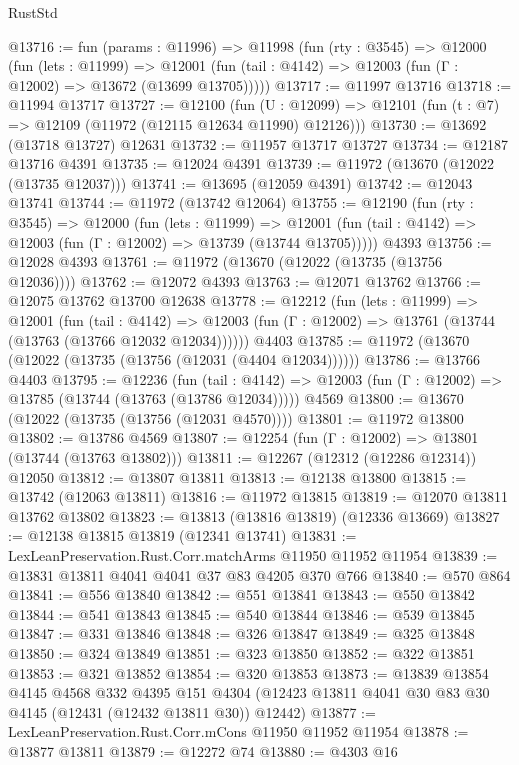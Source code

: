 \begin{lexlean}{RustStd}
\begin{coremodule}
@13716 := fun (params : @11996) =>
  @11998
    (fun (rty : @3545) =>
    @12000
      (fun (lets : @11999) =>
      @12001 (fun (tail : @4142) => @12003 (fun (Γ : @12002) => @13672 (@13699 @13705)))))
@13717 := @11997 @13716
@13718 := @11994 @13717
@13727 := @12100
    (fun (U : @12099) => @12101 (fun (t : @7) => @12109 (@11972 (@12115 @12634 @11990) @12126)))
@13730 := @13692 (@13718 @13727) @12631
@13732 := @11957 @13717 @13727
@13734 := @12187 @13716 @4391
@13735 := @12024 @4391
@13739 := @11972 (@13670 (@12022 (@13735 @12037)))
@13741 := @13695 (@12059 @4391)
@13742 := @12043 @13741
@13744 := @11972 (@13742 @12064)
@13755 := @12190
    (fun (rty : @3545) =>
    @12000
      (fun (lets : @11999) =>
      @12001 (fun (tail : @4142) => @12003 (fun (Γ : @12002) => @13739 (@13744 @13705)))))
    @4393
@13756 := @12028 @4393
@13761 := @11972 (@13670 (@12022 (@13735 (@13756 @12036))))
@13762 := @12072 @4393
@13763 := @12071 @13762
@13766 := @12075 @13762 @13700 @12638
@13778 := @12212
    (fun (lets : @11999) =>
    @12001
      (fun (tail : @4142) =>
      @12003 (fun (Γ : @12002) => @13761 (@13744 (@13763 (@13766 @12032 @12034))))))
    @4403
@13785 := @11972 (@13670 (@12022 (@13735 (@13756 (@12031 (@4404 @12034))))))
@13786 := @13766 @4403
@13795 := @12236
    (fun (tail : @4142) => @12003 (fun (Γ : @12002) => @13785 (@13744 (@13763 (@13786 @12034)))))
    @4569
@13800 := @13670 (@12022 (@13735 (@13756 (@12031 @4570))))
@13801 := @11972 @13800
@13802 := @13786 @4569
@13807 := @12254 (fun (Γ : @12002) => @13801 (@13744 (@13763 @13802)))
@13811 := @12267 (@12312 (@12286 @12314)) @12050
@13812 := @13807 @13811
@13813 := @12138 @13800
@13815 := @13742 (@12063 @13811)
@13816 := @11972 @13815
@13819 := @12070 @13811 @13762 @13802
@13823 := @13813 (@13816 @13819) (@12336 @13669)
@13827 := @12138 @13815 @13819 (@12341 @13741)
@13831 := LexLeanPreservation.Rust.Corr.matchArms @11950 @11952 @11954
@13839 := @13831 @13811 @4041 @4041 @37 @83 @4205 @370 @766
@13840 := @570 @864
@13841 := @556 @13840
@13842 := @551 @13841
@13843 := @550 @13842
@13844 := @541 @13843
@13845 := @540 @13844
@13846 := @539 @13845
@13847 := @331 @13846
@13848 := @326 @13847
@13849 := @325 @13848
@13850 := @324 @13849
@13851 := @323 @13850
@13852 := @322 @13851
@13853 := @321 @13852
@13854 := @320 @13853
@13873 := @13839
    @13854
    @4145
    @4568
    @332
    @4395
    @151
    @4304
    (@12423 @13811 @4041 @30 @83 @30 @4145 (@12431 (@12432 @13811 @30)) @12442)
@13877 := LexLeanPreservation.Rust.Corr.mCons @11950 @11952 @11954
@13878 := @13877 @13811
@13879 := @12272 @74
@13880 := @4303 @16

\end{coremodule}
\end{lexlean}
